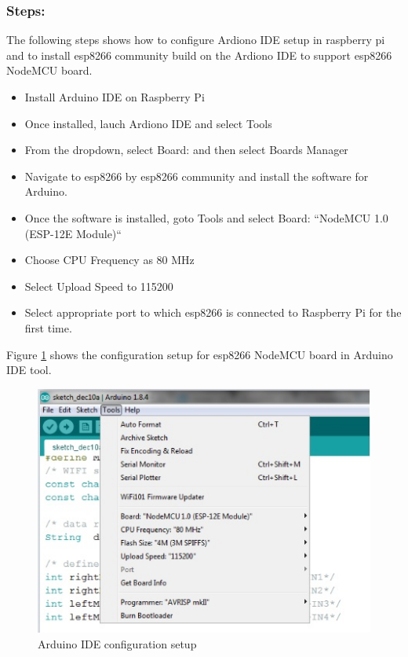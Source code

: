 \documentclass[sigconf]{acmart}
\begin{document}
\subsubsection{Steps:}
The following steps shows how to configure Ardiono IDE setup in 
raspberry pi and to install esp8266 community build on the Ardiono IDE 
to support esp8266 NodeMCU board.
\begin{itemize}

\item Install Arduino IDE on Raspberry Pi
\item Once installed, lauch Ardiono IDE and select Tools
\item From the dropdown, select Board:  and then select Boards Manager
\item Navigate to esp8266 by esp8266 community and install the
  software for Arduino.
\item Once the software is installed, goto Tools and select Board:
  ``NodeMCU 1.0 (ESP-12E Module)``
\item Choose CPU Frequency as 80 MHz
\item Select Upload Speed to 115200
\item Select appropriate port to which esp8266 is connected to
  Raspberry Pi for the first time.

\end{itemize}
Figure \ref{F:arduino} shows the configuration setup for esp8266 NodeMCU board in Arduino IDE tool.
\begin{figure}
	\includegraphics[width=1.0\columnwidth]{images/Arduino-settings.jpg}
	\caption{Arduino IDE configuration setup}\label{F:arduino}
\end{figure}
\end{document}
